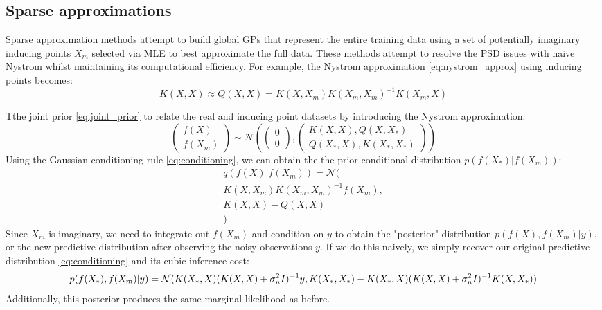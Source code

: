 \subsection{Sparse approximations}
Sparse approximation methods attempt to build global GPs that represent the entire training data using a set of potentially imaginary inducing points $X_m$ selected via MLE to best approximate the full data. These methods attempt to resolve the PSD issues with naive Nystrom whilst maintaining its computational efficiency. For example, the Nystrom approximation \ref{eq:nystrom_approx} using inducing points becomes:
\begin{equation*}
    K(X, X) \approx Q(X, X) = K(X, X_m) K(X_m, X_m)^{-1} K(X_m, X)
\end{equation*}

Tthe joint prior \ref{eq:joint_prior} to relate the real and inducing point datasets by introducing the Nystrom approximation:
\begin{equation*}
    \begin{pmatrix}
        f(X) \\ f(X_m)
    \end{pmatrix} \sim \mathcal{N} \left(
    \begin{pmatrix}
        0 \\ 0
    \end{pmatrix},
    \begin{pmatrix}
        K(X, X), Q(X, X_*) \\ Q(X_*, X), K(X_*, X_*)
    \end{pmatrix}
    \right)
\end{equation*}
Using the Gaussian conditioning rule \ref{eq:conditioning}, we can obtain the the prior conditional distribution $p(f(X_*) | f(X_m))$:
\begin{equation} \label{eq:sparse_exact_prior}
    \begin{aligned}
        q(f(X) | f(X_m)) = \mathcal{N}( \\
            K(X, X_m) K(X_m, X_m)^{-1} f(X_m), \\
            K(X, X) - Q(X, X) \\
        )
    \end{aligned}
\end{equation}
Since $X_m$ is imaginary, we need to integrate out $f(X_m)$ and condition on $y$ to obtain the "posterior" distribution $p(f(X), f(X_m) | y)$, or the new predictive distribution after observing the noisy observations $y$. If we do this naively, we simply recover our original predictive distribution \ref{eq:conditioning} and its cubic inference cost:
\begin{equation*}
    p(f(X_*), f(X_m) | y) = \mathcal{N}( \\
        K(X_*, X) (K(X, X) + \sigma_n^2 I)^{-1} y, \\
        K(X_*, X_*) - K(X_*, X) (K(X, X) + \sigma_n^2 I)^{-1} K(X, X_*)
    )
\end{equation*}
Additionally, this posterior produces the same marginal likelihood \label{eq:marginal_likelihood} as before.

